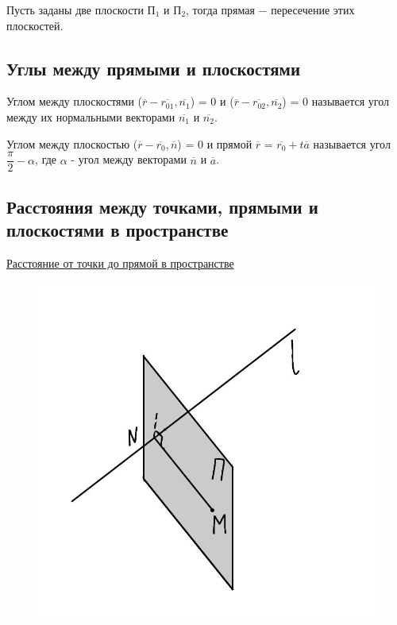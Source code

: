 Пусть заданы две плоскости П$_1$ и П$_2$, тогда прямая $-$ пересечение этих плоскостей.

\subsection{Углы между прямыми и плоскостями}

\begin{definition}
    Углом между плоскостями ($\overline{r} - \overline{r_{01}}, \overline{n_1}$) = 0 и ($\overline{r} - \overline{r_{02}}, \overline{n_2}$) = 0 называется угол между их нормальными векторами $\overline{n_1}$ и $\overline{n_2}$.
\end{definition}

\begin{definition}
    Углом между плоскостью ($\overline{r} - \overline{r_{0}}, \overline{n}$) = 0 и прямой $\overline{r}$ = $\overline{r_0} + t\overline{a}$ называется угол $\dfrac{\pi}{2} - \alpha$, где $\alpha$ - угол между векторами $\overline{n}$ и $\overline{a}$.
\end{definition}

\subsection{Расстояния между точками, прямыми и плоскостями в пространстве}

\underline{Расстояние от точки до прямой в пространстве}\\

\begin{figure}
    \includegraphics[width=0.84\linewidth]{images/3.2.jpeg}
\end{figure}
\tab\\

